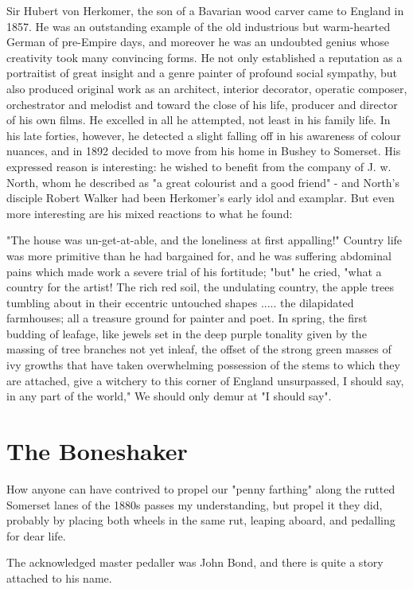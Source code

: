 Sir Hubert von Herkomer, the son of a Bavarian wood carver came to England in 1857. He was an outstanding example of the old industrious but warm-hearted German of pre-Empire days, and moreover he was an undoubted genius whose creativity took many convincing forms. He not only established a reputation as a portraitist of great insight and a genre painter of profound social sympathy, but also produced original work as an architect, interior decorator, operatic composer, orchestrator and melodist and toward the close of his life, producer and director of his own films. He excelled in all he attempted, not least in his family life. In his late forties, however, he detected a slight falling off in his awareness of colour nuances, and in 1892 decided to move from his home in Bushey to Somerset. His expressed reason is interesting: he wished to benefit from the company of J. w.  North, whom he described as "a great colourist and a good friend" - and North's disciple Robert Walker had been Herkomer's early idol and examplar. But even more interesting are his mixed reactions to what he found:

"The house was un-get-at-able, and the loneliness at first appalling!" Country life was more primitive than he had bargained for, and he was suffering abdominal pains which made work a severe trial of his fortitude; "but" he cried,
"what a country for the artist! 	 The rich red soil, the undulating country, the apple trees tumbling about in their eccentric untouched shapes ..... the dilapidated farmhouses; all a treasure ground for painter and poet. In spring, the first budding of leafage, like jewels set in the deep purple tonality given by the massing of tree branches not yet inleaf, the offset of the strong green masses of ivy growths that have taken overwhelming possession of the stems to which they are attached, give a witchery to this corner of England unsurpassed,
I should say, in any part of the world,"
We should only demur at "I should say".
 
\section{The Boneshaker}

How anyone can have contrived to propel our "penny farthing" along the rutted Somerset lanes of the 1880s passes my understanding, but propel it they did, probably by placing both wheels in the same rut, leaping aboard, and pedalling for dear life.

The acknowledged master pedaller was John Bond, and there is quite a story attached to his name. 

